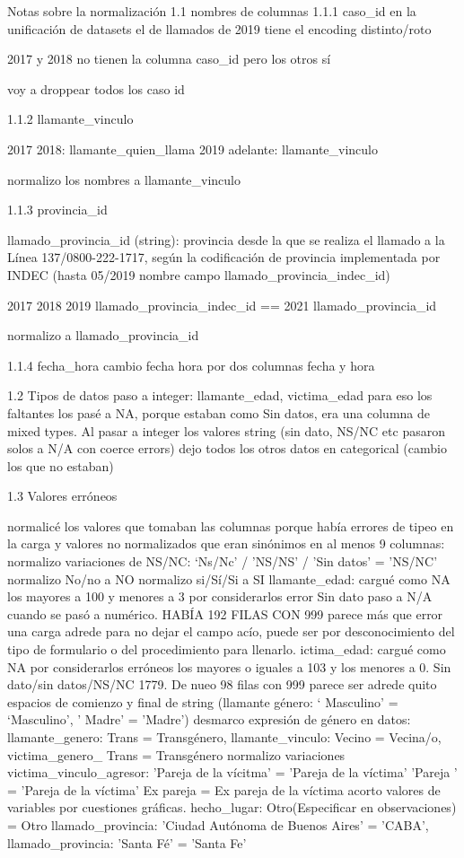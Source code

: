 \documentclass[10pt, spanish]{article}
\begin{document}
Notas sobre la normalización
1.1 nombres de columnas
1.1.1 caso_id
en la unificación de datasets el de llamados de 2019 tiene el encoding distinto/roto

2017 y 2018 no tienen la columna caso_id pero los otros sí

voy a droppear todos los caso id

1.1.2 llamante_vinculo

2017 2018: llamante_quien_llama
2019 adelante: llamante_vinculo

normalizo los nombres a llamante_vinculo

1.1.3 provincia_id

llamado_provincia_id (string): provincia desde la que se realiza el llamado a la Línea 137/0800-222-1717, según la codificación de provincia implementada por INDEC (hasta 05/2019 nombre campo llamado_provincia_indec_id)

2017 2018 2019 llamado_provincia_indec_id ==  2021 llamado_provincia_id

normalizo a llamado_provincia_id


1.1.4 fecha_hora
cambio fecha hora por dos columnas fecha y hora

1.2 Tipos de datos
paso a integer: llamante_edad, victima_edad para eso los faltantes los pasé a NA, porque estaban como Sin datos, era una columna de mixed types. Al pasar a integer los valores string (sin dato, NS/NC etc pasaron solos a N/A con coerce errors)
dejo todos los otros datos en categorical (cambio los que no estaban)

1.3 Valores erróneos

normalicé los valores que tomaban las columnas porque había errores de tipeo en la carga y valores no normalizados que eran sinónimos en al menos 9 columnas:
normalizo variaciones de NS/NC:  ‘Ns/Nc’ / 'NS/NS' / 'Sin datos' = 'NS/NC'
normalizo No/no a NO
normalizo si/Sí/Si a SI
llamante_edad: cargué como NA los mayores a 100 y menores a 3 por considerarlos error Sin dato paso a N/A cuando se pasó a numérico. HABÍA 192 FILAS CON 999 parece más que error una carga adrede para no dejar el campo acío, puede ser por desconocimiento del tipo de formulario o del procedimiento para llenarlo.
ictima_edad: cargué como NA por considerarlos erróneos los mayores o iguales a 103 y los menores a 0. Sin dato/sin datos/NS/NC 1779. De nueo 98 filas con 999 parece ser adrede
quito espacios de comienzo y final de string (llamante género: ‘ Masculino’ = ‘Masculino’, ' Madre' = 'Madre')
desmarco expresión de género en datos: llamante_genero: Trans = Transgénero, llamante_vinculo: Vecino = Vecina/o, victima_genero_ Trans = Transgénero
normalizo variaciones victima_vinculo_agresor: 'Pareja de la vícitma' = 'Pareja de la víctima' 'Pareja ' = 'Pareja de la víctima' Ex pareja = Ex pareja de la víctima
acorto valores de variables por cuestiones gráficas. hecho_lugar: Otro(Especificar en observaciones) = Otro
llamado_provincia: 'Ciudad Autónoma de Buenos Aires' = 'CABA', llamado_provincia: 'Santa Fé' = 'Santa Fe'
\end{document}
